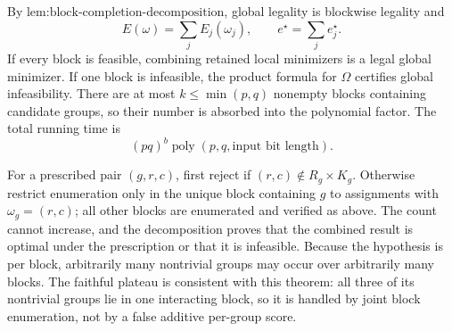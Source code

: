 By \(\text{lem:block-completion-decomposition}\), global legality is blockwise legality and
\[
E(\omega)=\sum_jE_j(\omega_j),\qquad e^\star=\sum_je_j^\star.
\]
If every block is feasible, combining retained local minimizers is a legal global minimizer. If one block is infeasible, the product formula for \(\Omega\) certifies global infeasibility. There are at most \(k\le\min(p,q)\) nonempty blocks containing candidate groups, so their number is absorbed into the polynomial factor. The total running time is
\[
(pq)^b\operatorname{poly}(p,q,\text{input bit length}).
\]

For a prescribed pair \((g,r,c)\), first reject if \((r,c)\notin R_g\times K_g\). Otherwise restrict enumeration only in the unique block containing \(g\) to assignments with \(\omega_g=(r,c)\); all other blocks are enumerated and verified as above. The count cannot increase, and the decomposition proves that the combined result is optimal under the prescription or that it is infeasible. Because the hypothesis is per block, arbitrarily many nontrivial groups may occur over arbitrarily many blocks. The faithful plateau is consistent with this theorem: all three of its nontrivial groups lie in one interacting block, so it is handled by joint block enumeration, not by a false additive per-group score.


